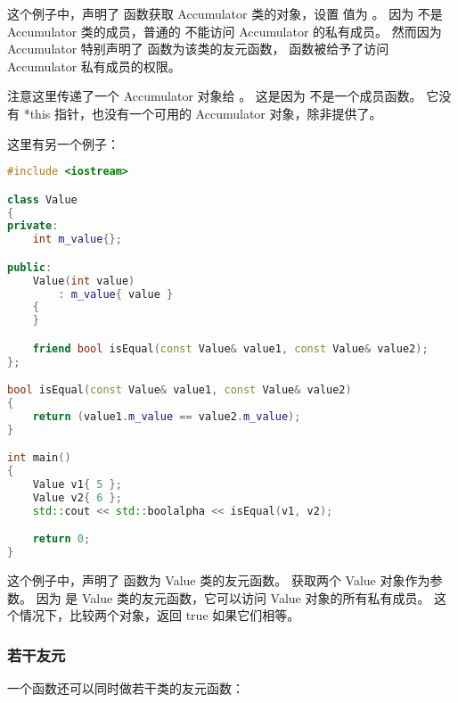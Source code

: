 \documentclass[../../LearnCpp.tex]{subfiles}
\begin{document}
这个例子中，声明了  函数获取 Accumulator 类的对象，设置  值为 。
因为  不是 Accumulator 类的成员，普通的  不能访问 Accumulator 的私有成员。
然而因为 Accumulator 特别声明了  函数为该类的友元函数， 函数被给予了访问 Accumulator 私有成员的权限。

注意这里传递了一个 Accumulator 对象给 。
这是因为  不是一个成员函数。
它没有 *this 指针，也没有一个可用的 Accumulator 对象，除非提供了。

这里有另一个例子：

\begin{lstlisting}[language=C++]
#include <iostream>

class Value
{
private:
    int m_value{};

public:
    Value(int value)
        : m_value{ value }
    {
    }

    friend bool isEqual(const Value& value1, const Value& value2);
};

bool isEqual(const Value& value1, const Value& value2)
{
    return (value1.m_value == value2.m_value);
}

int main()
{
    Value v1{ 5 };
    Value v2{ 6 };
    std::cout << std::boolalpha << isEqual(v1, v2);

    return 0;
}
\end{lstlisting}

这个例子中，声明了  函数为 Value 类的友元函数。
 获取两个 Value 对象作为参数。
因为  是 Value 类的友元函数，它可以访问 Value 对象的所有私有成员。
这个情况下，比较两个对象，返回 true 如果它们相等。

\subsubsection*{若干友元}

一个函数还可以同时做若干类的友元函数：
\end{document}
